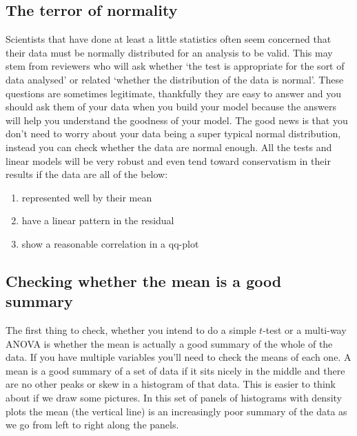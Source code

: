 \documentclass[
]{book}
\providecommand{\tightlist}{%
  \setlength{\itemsep}{0pt}\setlength{\parskip}{0pt}}
\begin{document}
\hypertarget{the-terror-of-normality}{%
\subsection{The terror of normality}\label{the-terror-of-normality}}

Scientists that have done at least a little statistics often seem concerned that their data must be normally distributed for an analysis to be valid. This may stem from reviewers who will ask whether `the test is appropriate for the sort of data analysed' or related `whether the distribution of the data is normal'. These questions are sometimes legitimate, thankfully they are easy to answer and you should ask them of your data when you build your model because the answers will help you understand the goodness of your model. The good news is that you don't need to worry about your data being a super typical normal distribution, instead you can check whether the data are normal enough. All the tests and linear models will be very robust and even tend toward conservatism in their results if the data are all of the below:

\begin{enumerate}
\def\labelenumi{\arabic{enumi}.}
\tightlist
\item
  represented well by their mean
\item
  have a linear pattern in the residual
\item
  show a reasonable correlation in a qq-plot
\end{enumerate}

\hypertarget{checking-whether-the-mean-is-a-good-summary}{%
\subsection{Checking whether the mean is a good summary}\label{checking-whether-the-mean-is-a-good-summary}}

The first thing to check, whether you intend to do a simple \(t\)-test or a multi-way ANOVA is whether the mean is actually a good summary of the whole of the data. If you have multiple variables you'll need to check the means of each one. A mean is a good summary of a set of data if it sits nicely in the middle and there are no other peaks or skew in a histogram of that data. This is easier to think about if we draw some pictures. In this set of panels of histograms with density plots the mean (the vertical line) is an increasingly poor summary of the data as we go from left to right along the panels.
\end{document}
